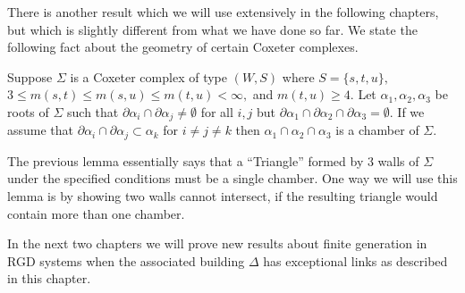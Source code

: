 \documentclass[class=book, crop=false,12 pt]{standalone}
\begin{document}
There is another result which we will use extensively in the following chapters, but which is slightly different from what we have done so far. We state the following fact about the geometry of certain Coxeter complexes. 

\begin{lemma}
	\label{lem:tri}
	Suppose $\Sigma$ is a Coxeter complex of type $(W,S)$ where $S=\{s,t,u\},$ $3\le m(s,t)\le m(s,u)\le m(t,u)<\infty,$ and $m(t,u)\ge 4.$ Let $\alpha_1,\alpha_2,\alpha_3$ be roots of $\Sigma$ such that $\partial\alpha_i\cap \partial\alpha_j\neq \emptyset$ for all $i,j$ but $\partial\alpha_1\cap \partial\alpha_2\cap \partial \alpha_3=\emptyset.$ If we assume that $\partial\alpha_i\cap \partial\alpha_j\subset \alpha_k$ for $i\neq j\neq k$ then $\alpha_1\cap \alpha_2\cap\alpha_3$ is a chamber of $\Sigma.$
\end{lemma}

The previous lemma essentially says that a ``Triangle'' formed by 3 walls of $\Sigma$ under the specified conditions must be a single chamber. One way we will use this lemma is by showing two walls cannot intersect, if the resulting triangle would contain more than one chamber.

In the next two chapters we will prove new results about finite generation in RGD systems when the associated building $\Delta$ has exceptional links as described in this chapter.
\end{document}
